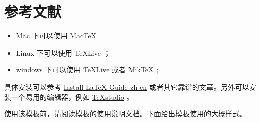 \documentclass[withoutpreface,bwprint]{cumcmthesis} %
\begin{document}
\section{参考文献}
\begin{itemize}
    \item Mac 下可以使用 Mac\TeX{}
    \item Linux 下可以使用 \TeX{}Live ；
    \item windows 下可以使用 \TeX{}Live 或者 Mik\TeX{} ;
\end{itemize}

具体安装可以参考 \href{https://github.com/OsbertWang/install-latex-guide-zh-cn/releases/}{Install-LaTeX-Guide-zh-cn} 或者其它靠谱的文章。另外可以安装一个易用的编辑器，例如 \href{https://mirrors.tuna.tsinghua.edu.cn/github-release/texstudio-org/texstudio/LatestRelease/}{\TeX{}studio} 。

使用该模板前，请阅读模板的使用说明文档。下面给出模板使用的大概样式。
\end{document}
